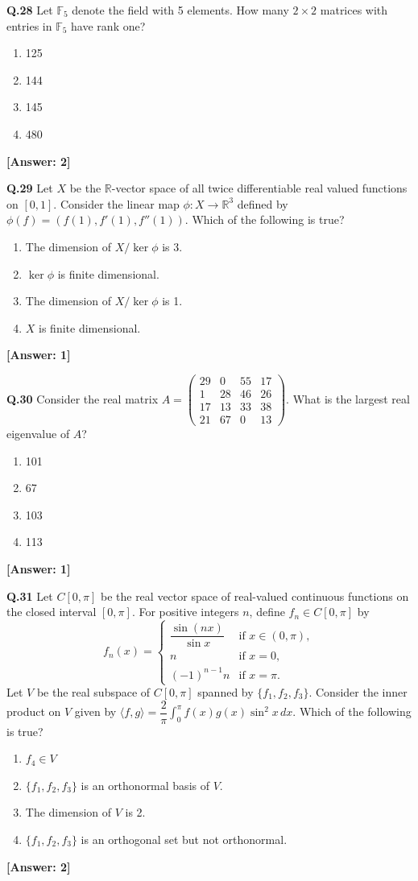 \documentclass[12pt,a4paper]{article}
\newcommand{\ans}[1]{\quad\textcolor{anscolor}{\textbf{[Answer: #1]}}}
\begin{document}
\textbf{Q.28} Let $\mathbb{F}_5$ denote the field with 5 elements. How many $2\times2$ matrices with entries in $\mathbb{F}_5$ have rank one?
\begin{enumerate}[label=\arabic*.]
\item 125 \item 144 \item 145 \item 480
\end{enumerate}\ans{2}

\textbf{Q.29} Let $X$ be the $\mathbb{R}$-vector space of all twice differentiable real valued functions on $[0,1]$. Consider the linear map $\phi:X\to\mathbb{R}^3$ defined by $\phi(f)=(f(1),f'(1),f''(1))$. Which of the following is true?
\begin{enumerate}[label=\arabic*.]
\item The dimension of $X/\ker\phi$ is 3.
\item $\ker\phi$ is finite dimensional.
\item The dimension of $X/\ker\phi$ is 1.
\item $X$ is finite dimensional.
\end{enumerate}\ans{1}

\textbf{Q.30} Consider the real matrix $A=\begin{pmatrix}29&0&55&17\\1&28&46&26\\17&13&33&38\\21&67&0&13\end{pmatrix}$. What is the largest real eigenvalue of $A$?
\begin{enumerate}[label=\arabic*.]
\item 101 \item 67 \item 103 \item 113
\end{enumerate}\ans{1}

\textbf{Q.31} Let $C[0,\pi]$ be the real vector space of real-valued continuous functions on the closed interval $[0,\pi]$. For positive integers $n$, define $f_n\in C[0,\pi]$ by
\[f_n(x)=\begin{cases}\dfrac{\sin(nx)}{\sin x}&\text{if }x\in(0,\pi),\\ n&\text{if }x=0,\\ (-1)^{n-1}n&\text{if }x=\pi.\end{cases}\]
Let $V$ be the real subspace of $C[0,\pi]$ spanned by $\{f_1,f_2,f_3\}$. Consider the inner product on $V$ given by $\langle f,g\rangle=\dfrac{2}{\pi}\int_0^\pi f(x)g(x)\sin^2x\,dx$. Which of the following is true?
\begin{enumerate}[label=\arabic*.]
\item $f_4\in V$
\item $\{f_1,f_2,f_3\}$ is an orthonormal basis of $V$.
\item The dimension of $V$ is 2.
\item $\{f_1,f_2,f_3\}$ is an orthogonal set but not orthonormal.
\end{enumerate}\ans{2}
\end{document}
